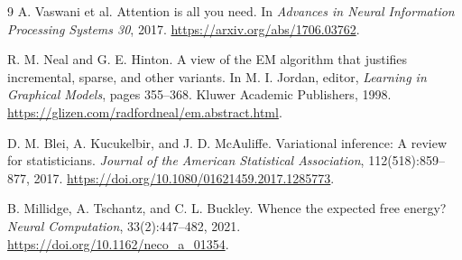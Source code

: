 \documentclass[11pt]{article}
\theoremstyle{definition}
\theoremstyle{remark}
\begin{document}
\begin{thebibliography}{9}
A. Vaswani et al.
\newblock Attention is all you need.
\newblock In \emph{Advances in Neural Information Processing Systems 30}, 2017.
\newblock \url{https://arxiv.org/abs/1706.03762}.

R. M. Neal and G. E. Hinton.
\newblock A view of the EM algorithm that justifies incremental, sparse, and other variants.
\newblock In M. I. Jordan, editor, \emph{Learning in Graphical Models}, pages 355--368.
Kluwer Academic Publishers, 1998.
\newblock \url{https://glizen.com/radfordneal/em.abstract.html}.

D. M. Blei, A. Kucukelbir, and J. D. McAuliffe.
\newblock Variational inference: A review for statisticians.
\newblock \emph{Journal of the American Statistical Association}, 112(518):859--877, 2017.
\newblock \url{https://doi.org/10.1080/01621459.2017.1285773}.

B. Millidge, A. Tschantz, and C. L. Buckley.
\newblock Whence the expected free energy?
\newblock \emph{Neural Computation}, 33(2):447--482, 2021.
\newblock \url{https://doi.org/10.1162/neco_a_01354}.
\end{thebibliography}
\end{document}
